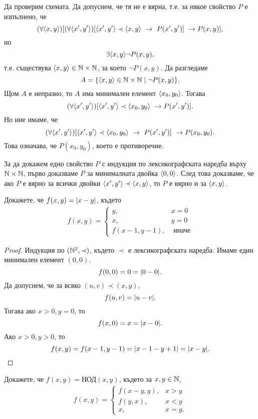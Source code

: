 Да проверим схемата.
Да допуснем, че тя не е вярна, т.е. за някое свойство $P$ е изпълнено, че
\[(\forall\pair{x,y})[(\forall \pair{x^\prime,y^\prime})[\pair{x^\prime,y^\prime} \prec \pair{x,y}\ \rightarrow\ P(x^\prime,y^\prime)]\ \rightarrow P(x,y)],\]
но \[\exists \langle{x,y}\rangle \neg P(x,y),\]
т.е. съществува $\langle{x,y}\rangle \in \mathbb{N}\times\mathbb{N}$, за което $\neg P(x,y)$.
Да разгледаме
\[A = \{\langle{x,y}\rangle\in \mathbb{N}\times\mathbb{N}\mid \neg P(x,y)\}.\]
Щом $A$ е непразно, то $A$ има минимален елемент $\langle{x_0,y_0}\rangle$.
Тогава
\[(\forall \pair{x^\prime,y^\prime})[\pair{x^\prime,y^\prime} \prec\pair{x_0,y_0}\ \rightarrow P(x^\prime,y^\prime)].\]
Но ние имаме, че 
\[(\forall \pair{x^\prime,y^\prime})[\pair{x^\prime,y^\prime} \prec \pair{x_0,y_0}\ \rightarrow\ P(x^\prime,y^\prime)]\ \rightarrow P(x_0,y_0).\]
Това означава, че $P(x_0,y_0)$, което е противоречие.

\begin{remark}
  За да докажем едно свойство $P$ с индукция по лексикографската наредба върху $\mathbb{N}\times\mathbb{N}$,
  първо доказваме $P$ за минималната двойка $\langle{0,0}\rangle$.
  След това доказваме, че ако $P$ е вярно за всички двойки $\langle{x^\prime,y^\prime}\rangle\prec \langle{x,y}\rangle$,
  то $P$ е вярно и за $\langle{x,y}\rangle$.
\end{remark}

\begin{problem}
  Докажете,  че $f(x,y) = \lvert{x-y}\rvert$, където
  \begin{align*}
    f(x,y) = 
    \begin{cases}
      y, & x = 0\\
      x, & y = 0\\
      f(x-1,y-1), & \mbox{ иначе}
    \end{cases}
  \end{align*}
\end{problem}
\begin{proof}
  Индукция по $(\mathbb{N}^2,\prec)$, където $\prec$ е лексикографската наредба.
  Имаме един минимален елемент $(0,0)$.
  \[f(0,0) = 0 = \lvert{0 - 0}\rvert.\]
  Да допуснем, че за всяко $(u,v) \prec (x,y)$, 
  \[f(u,v) = \lvert{u - v}\rvert.\]
  Тогава ако $x > 0, y = 0$, то
  \[f(x,0) = x = \lvert{x - 0}\rvert.\]
  Ако $x> 0, y > 0$, то
  \[f(x,y) = f(x-1,y-1) = \lvert{x-1-y+1}\rvert =\lvert{x-y}\rvert.\]
\end{proof}

\begin{problem}
  Докажете, че $f(x,y) = \mbox{НОД}(x,y)$, където
  за $x,y \in \mathbb{N}$,
  \begin{align*}
    f(x,y) = 
    \begin{cases}
      f(x-y,y), & x > y\\
      f(y,x), & x < y\\
      x, & x = y.
    \end{cases}
  \end{align*}
\end{problem}


